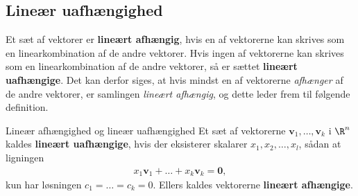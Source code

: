 \subsection{Lineær uafhængighed}
Et sæt af vektorer er \textbf{lineært afhængig}, hvis en af vektorerne kan skrives som en linearkombination af de andre vektorer. Hvis ingen af vektorerne kan skrives som en linearkombination af de andre vektorer, så er sættet \textbf{lineært uafhængige}. Det kan derfor siges, at hvis mindst en af vektorerne \textit{afhænger} af de andre vektorer, er samlingen \textit{lineært afhængig}, og dette leder frem til følgende definition. 
% 
\begin{defn}{Lineær afhængighed og lineær uafhængighed}{}
Et sæt af vektorerne $\mathbf{v}_1, \ldots , \mathbf{v}_k$ i $\R^n$ kaldes \textbf{lineært uafhængige}, hvis der eksisterer skalarer $x_1,x_2, \ldots , x_l$, sådan at ligningen 
\begin{align*}
x_1\mathbf{v}_1 + \ldots + x_k \mathbf{v}_k = \mathbf{0}, 
\end{align*}
kun har løsningen $c_1 = \ldots = c_k = 0$.
Ellers kaldes vektorerne \textbf{lineært afhængige}.
\end{defn}
%
